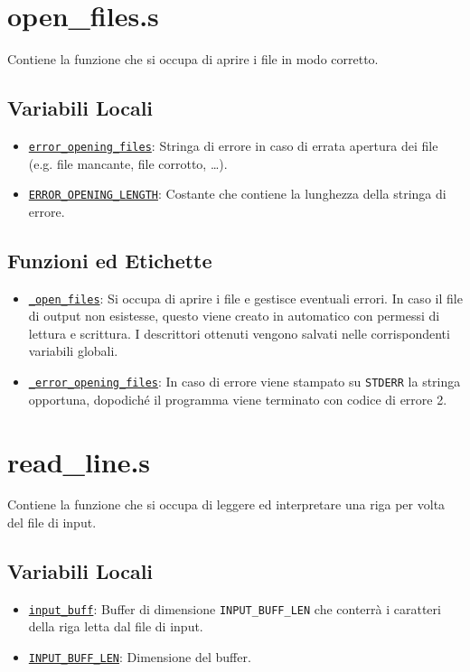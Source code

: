 \documentclass[a4paper,11pt]{article}
\newcommand{\itemtt}[1]{\item \texttt{#1}}
\begin{document}
	\section{open\_files.s}
	Contiene la funzione che si occupa di aprire i file in modo corretto.
	
	\subsection{Variabili Locali} 
	\begin{itemize}
		\itemtt{\hyperref[v:2:1]{error\_opening\_files}}: Stringa di errore in caso di errata apertura dei file (e.g. file mancante, file corrotto, \ldots).
		\itemtt{\hyperref[v:2:2]{ERROR\_OPENING\_LENGTH}}: Costante che contiene la lunghezza della stringa di errore.
	\end{itemize}
	
	\subsection{Funzioni ed Etichette}
	\begin{itemize}
		\itemtt{\hyperref[e:2:1]{\_open\_files}}: Si occupa di aprire i file e gestisce eventuali errori. In caso il file di output non esistesse, questo viene creato in automatico con permessi di lettura e scrittura. I descrittori ottenuti vengono salvati nelle corrispondenti variabili globali. 
		\itemtt{\hyperref[e:2:2]{\_error\_opening\_files}}: In caso di errore viene stampato su \texttt{STDERR} la stringa opportuna, dopodiché il programma viene terminato con codice di errore 2. 
	\end{itemize}
	
	\section{read\_line.s}
	Contiene la funzione che si occupa di leggere ed interpretare una riga per volta del file di input.
	\subsection{Variabili Locali}
	\begin{itemize}
		\itemtt{\hyperref[v:3:1]{input\_buff}}: Buffer di dimensione \texttt{INPUT\_BUFF\_LEN} che conterrà i caratteri della riga letta dal file di input.
		\itemtt{\hyperref[v:3:2]{INPUT\_BUFF\_LEN}}: Dimensione del buffer.
	\end{itemize}
	
\end{document}
